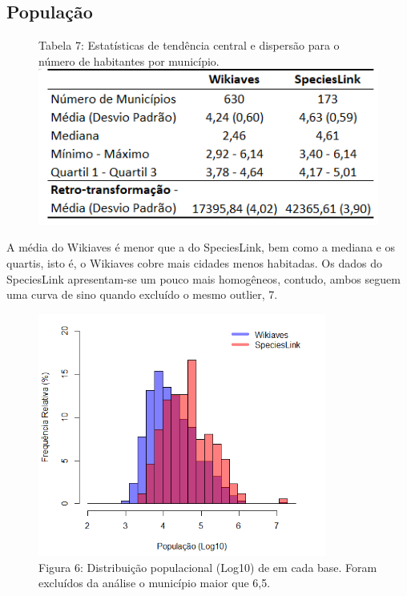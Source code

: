 \documentclass[12pt]{extarticle}
\newenvironment{resposta}{ \color{mygray}}{}
\begin{document}
\newpage

\subsection{População}

\begin{figure}[h!]
\centering
{\scriptsize Tabela 7: Estatísticas de tendência central e dispersão para o número de habitantes por município.}
\includegraphics{Imagens/T07.png}
\end{figure}

\begin{resposta}
A média do Wikiaves é menor que a do SpeciesLink, bem como a mediana e os quartis, isto é, o Wikiaves cobre mais cidades menos habitadas. Os dados do SpeciesLink apresentam-se um pouco mais homogêneos, contudo, ambos seguem uma curva de sino quando excluído o mesmo outlier, 7.
\end{resposta}


\begin{figure}[h!]
\centering
\includegraphics[height = 8cm]{Imagens/H06.png}
\\{\scriptsize Figura 6: Distribuição populacional (Log10) de em cada base. Foram excluídos da análise o município maior que 6,5.}
\end{figure}
\end{document}
